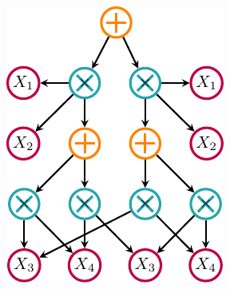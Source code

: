 \documentclass[xcolor={usenames,dvipsnames,svgnames}, compress]{beamer}
\begin{document}
\begin{frame}[t]
\begin{minipage}{0.63\textwidth}
\end{minipage}\hspace{15pt}
\begin{minipage}{0.28\textwidth}
  \vspace{-20pt}
\centering
\includegraphics[width=0.85\columnwidth]{figures/spn-colored}
\end{minipage}

  \end{frame}
\end{document}
